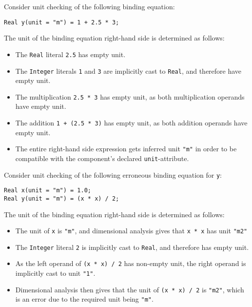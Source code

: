 \begin{example}
Consider unit checking of the following binding equation:
\begin{lstlisting}[language=modelica]
Real y(unit = "m") = 1 + 2.5 * 3;
\end{lstlisting}
The unit of the binding equation right-hand side is determined as follows:
\begin{itemize}
\item The \lstinline!Real! literal \lstinline!2.5! has empty unit.
\item The \lstinline!Integer! literals \lstinline!1! and \lstinline!3! are implicitly cast to \lstinline!Real!, and therefore have empty unit.
\item The multiplication \lstinline!2.5 * 3! has empty unit, as both multiplication operands have empty unit.
\item The addition \lstinline!1 + (2.5 * 3)! has empty unit, as both addition operands have empty unit.
\item The entire right-hand side expression gets inferred unit \lstinline!"m"! in order to be compatible with the component's declared \lstinline!unit!-attribute.
\end{itemize}
\end{example}

\begin{example}
Consider unit checking of the following erroneous binding equation for \lstinline!y!:
\begin{lstlisting}[language=modelica]
Real x(unit = "m") = 1.0;
Real y(unit = "m") = (x * x) / 2;
\end{lstlisting}
The unit of the binding equation right-hand side is determined as follows:
\begin{itemize}
\item The unit of \lstinline!x! is \lstinline!"m"!, and dimensional analysis gives that \lstinline!x * x! has unit \lstinline!"m2"!
\item The \lstinline!Integer! literal \lstinline!2! is implicitly cast to \lstinline!Real!, and therefore has empty unit.
\item As the left operand of \lstinline!(x * x) / 2! has non-empty unit, the right operand is implicitly cast to unit \lstinline!"1"!.
\item Dimensional analysis then gives that the unit of \lstinline!(x * x) / 2! is \lstinline!"m2"!, which is an error due to the required unit being \lstinline!"m"!.
\end{itemize}
\end{example}

